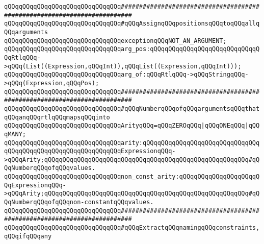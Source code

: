 \newline
\newline
\newline
\verb|qQQqqQQqqQQqqQQqqQQqqQQqqQQqqQQq#########################################################################|\newline
\verb|qQQqqQQqqQQqqQQqqQQqqQQqqQQqqQQq#qQQqAssignqQQqpositionsqQQqtoqQQqallqQQqarguments|\newline
\newline
\verb|qQQqqQQqqQQqqQQqqQQqqQQqqQQqqQQqexceptionqQQqNOT_AN_ARGUMENT;|\newline
\newline
\verb|qQQqqQQqqQQqqQQqqQQqqQQqqQQqqQQqarg_pos:qQQqqQQqqQQqqQQqqQQqqQQqqQQqqQQqRtlqQQq->qQQq(List((Expression,qQQqInt)),qQQqList((Expression,qQQqInt)));|\newline
\verb|qQQqqQQqqQQqqQQqqQQqqQQqqQQqqQQqarg_of:qQQqRtlqQQq->qQQqStringqQQq->qQQq(Expression,qQQqPos);|\newline
\newline
\newline
\newline
\verb|qQQqqQQqqQQqqQQqqQQqqQQqqQQqqQQq#########################################################################|\newline
\verb|qQQqqQQqqQQqqQQqqQQqqQQqqQQqqQQq#qQQqNumberqQQqofqQQqargumentsqQQqthatqQQqanqQQqrtlqQQqmapsqQQqinto|\newline
\newline
\verb|qQQqqQQqqQQqqQQqqQQqqQQqqQQqqQQqArityqQQq=qQQqZEROqQQq|\verb#|qQQqONEqQQq|qQQqMANY;#\newline
\newline
\verb|qQQqqQQqqQQqqQQqqQQqqQQqqQQqqQQqarity:qQQqqQQqqQQqqQQqqQQqqQQqqQQqqQQqqQQqqQQqqQQqqQQqqQQqqQQqqQQqqQQqExpressionqQQq->qQQqArity;qQQqqQQqqQQqqQQqqQQqqQQqqQQqqQQqqQQqqQQqqQQqqQQqqQQqqQQq#qQQqNumberqQQqofqQQqvalues.|\newline
\verb|qQQqqQQqqQQqqQQqqQQqqQQqqQQqqQQqnon_const_arity:qQQqqQQqqQQqqQQqqQQqqQQqExpressionqQQq->qQQqArity;qQQqqQQqqQQqqQQqqQQqqQQqqQQqqQQqqQQqqQQqqQQqqQQqqQQqqQQq#qQQqNumberqQQqofqQQqnon-constantqQQqvalues.|\newline
\newline
\newline
\newline
\verb|qQQqqQQqqQQqqQQqqQQqqQQqqQQqqQQq#########################################################################|\newline
\verb|qQQqqQQqqQQqqQQqqQQqqQQqqQQqqQQq#qQQqExtractqQQqnamingqQQqconstraints,qQQqifqQQqany|\newline
